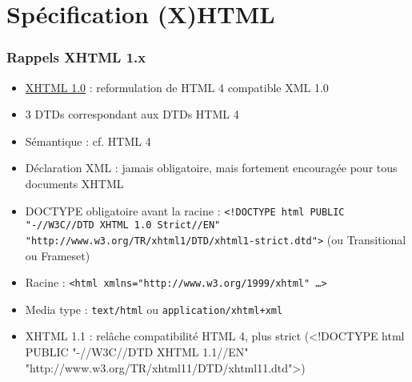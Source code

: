 \documentclass[english, french]{beamer}
\begin{document}
\section{Spécification (X)HTML}
\begin{frame}
	\frametitle{Rappels XHTML 1.x}
	\begin{itemize}
		\item \href{https://www.w3.org/TR/xhtml1/}{XHTML 1.0} : reformulation de HTML 4 compatible XML 1.0
		\item 3 DTDs correspondant aux DTDs HTML 4
		\item Sémantique : cf. HTML 4
		\item Déclaration XML : jamais obligatoire, mais fortement encouragée pour tous documents XHTML
		\item DOCTYPE obligatoire avant la racine : \texttt{\small{<!DOCTYPE html PUBLIC "-//W3C//DTD XHTML 1.0 Strict//EN" "http://www.w3.org/TR/xhtml1/DTD/xhtml1-strict.dtd">}} {\tiny (ou Transitional ou Frameset)}%
		\item Racine : \texttt{\small{<html xmlns="http://www.w3.org/1999/xhtml" …>}}%
		\item Media type : \texttt{text/html} ou \texttt{application/xhtml+xml}
		\item XHTML 1.1 : relâche compatibilité HTML 4, plus strict {\tiny (<!DOCTYPE html PUBLIC "-//W3C//DTD XHTML 1.1//EN" "http://www.w3.org/TR/xhtml11/DTD/xhtml11.dtd">)}
	\end{itemize}
\end{frame}
\end{document}
